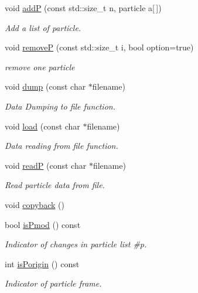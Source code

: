\begin{DoxyCompactItemize}
void \hyperlink{classARC_1_1chain_a658a7b777ac45e7900990dcc6ef0b752}{addP} (const std\+::size\+\_\+t n, particle a\mbox{[}$\,$\mbox{]})
\begin{DoxyCompactList}\small\item\em Add a list of particle. \end{DoxyCompactList}\item 
void \hyperlink{classARC_1_1chain_a6c622f6f09a11f81a72e26de0c8cbfc8}{removeP} (const std\+::size\+\_\+t i, bool option=true)
\begin{DoxyCompactList}\small\item\em remove one particle \end{DoxyCompactList}\item 
void \hyperlink{classARC_1_1chain_adefda13efa8a0a22e4597600ea1bc193}{dump} (const char $\ast$filename)
\begin{DoxyCompactList}\small\item\em Data Dumping to file function. \end{DoxyCompactList}\item 
void \hyperlink{classARC_1_1chain_aed5f04b05a5875cd9a8b45da8fdfa28c}{load} (const char $\ast$filename)
\begin{DoxyCompactList}\small\item\em Data reading from file function. \end{DoxyCompactList}\item 
void \hyperlink{classARC_1_1chain_ad2e17ce21d086e8852951cf31568cf76}{readP} (const char $\ast$filename)
\begin{DoxyCompactList}\small\item\em Read particle data from file. \end{DoxyCompactList}\item 
void \hyperlink{classARC_1_1chain_a780fe41b768a5f8821ea799dae8b3d10}{copyback} ()
\item 
bool \hyperlink{classARC_1_1chain_a9eab4abd4041c34e2853199b7431c887}{is\+Pmod} () const 
\begin{DoxyCompactList}\small\item\em Indicator of changes in particle list \#p. \end{DoxyCompactList}\item 
int \hyperlink{classARC_1_1chain_a31743bd53ac53b7fa6c6f14e8a6bc087}{is\+Porigin} () const 
\begin{DoxyCompactList}\small\item\em Indicator of particle frame. \end{DoxyCompactList}\item 

\end{DoxyCompactItemize}
